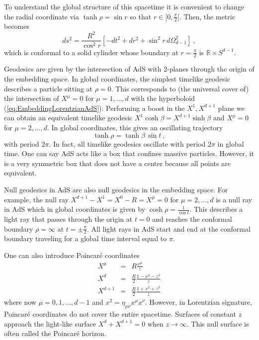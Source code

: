 \documentclass{ws-rv9x6}
\newcommand\be{\begin{equation}}
\newcommand\ee{\end{equation}}
\begin{document}
To understand the global structure of this spacetime it is convenient
to change the radial coordinate via $\tanh\rho=\sin r$ so that $r\in[0,\frac{\pi}{2}[$.
Then, the metric becomes
\begin{equation}
ds^{2}=\frac{R^{2}}{\cos^{2}r}\left[-dt^{2}+dr^{2}+\sin^{2}r\, d\Omega_{d-1}^{2}\right]\ ,\label{eq:compactglobalcoords}
\end{equation}
which is conformal to a solid cylinder whose boundary at $r=\frac{\pi}{2}$
is $\mathbb{R}\times S^{d-1}$.

Geodesics are given by the intersection of AdS with 2-planes through
the origin of the embedding space. In global coordinates, the simplest
timelike geodesic describes a particle sitting at $\rho=0$. This
corresponds to (the universal cover of) the intersection of $X^{\mu}=0$
for $\mu=1,\dots,d$ with the hyperboloid (\ref{eq:EmbeddingLorentzianAdS}).
Performing a boost in the $X^{1},X^{d+1}$ plane we can obtain an
equivalent timelike geodesic $X^{1}\cosh\beta=X^{d+1}\sinh\beta$
and $X^{\mu}=0$ for $\mu=2,\dots,d$. In global coordinates, this
gives an oscillating trajectory 
\be
\tanh\rho=\tanh\beta\,\sin t\ ,
\ee
with period $2\pi$. In fact, all timelike geodesics oscillate with
period $2\pi$ in global time. One can say AdS acts like a box that
confines massive particles. However, it is a very symmetric box that
does not have a center because all points are equivalent. 



Null geodesics in AdS are also null geodesics in the embedding space.
For example, the null ray $X^{d+1}-X^{1}=X^{0}-R=X^{\mu}=0$ for $\mu=2,\dots,d$
is a null ray in AdS which in global coordinates is given by $\cosh\rho=\frac{1}{\cos t}$.
This describes a light ray that passes through the origin at $t=0$
and reaches the conformal boundary $\rho=\infty$ at $t=\pm\frac{\pi}{2}$.
All light rays in AdS start and end at the conformal boundary traveling
for a global time interval equal to $\pi$. 

One can also introduce Poincaré coordinates 
\begin{eqnarray}
X^{\mu} & = & R\frac{x^{\mu}}{z} \nonumber \\
X^{d} & = & \frac{R}{2}\frac{1-x^{2}-z^{2}}{z}\\
X^{d+1} & = & \frac{R}{2}\frac{1+x^{2}+z^{2}}{z} \nonumber
\end{eqnarray}
where now $\mu=0,1,\dots,d-1$ and $x^{2}=\eta_{\mu\nu}x^{\mu}x^{\nu}$.
However, in Lorentzian signature, Poincaré coordinates do not cover
the entire spacetime. Surfaces of constant $z$ approach the light-like
surface $X^{d}+X^{d+1}=0$ when $z\to\infty$. This null surface is often called the Poincaré horizon.
\end{document}
